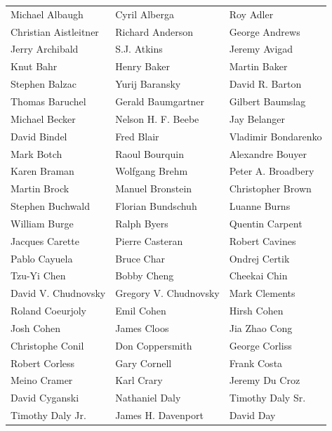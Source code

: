 \begin{tabular}{lll}
Michael Albaugh        & Cyril Alberga          & Roy Adler\\
Christian Aistleitner  & Richard Anderson       & George Andrews\\
Jerry Archibald        & S.J. Atkins            & Jeremy Avigad\\
Knut Bahr              & Henry Baker            & Martin Baker\\
Stephen Balzac         & Yurij Baransky         & David R. Barton\\
Thomas Baruchel        & Gerald Baumgartner     & Gilbert Baumslag\\
Michael Becker         & Nelson H. F. Beebe     & Jay Belanger\\
David Bindel           & Fred Blair             & Vladimir Bondarenko\\
Mark Botch             & Raoul Bourquin         & Alexandre Bouyer\\
Karen Braman           & Wolfgang Brehm         & Peter A. Broadbery\\
Martin Brock           & Manuel Bronstein       & Christopher Brown\\
Stephen Buchwald       & Florian Bundschuh      & Luanne Burns\\
William Burge          & Ralph Byers            & Quentin Carpent\\
Jacques Carette        & Pierre Casteran        & Robert Cavines\\
Pablo Cayuela          & Bruce Char             & Ondrej Certik\\
Tzu-Yi Chen            & Bobby Cheng            & Cheekai Chin\\
David V. Chudnovsky    & Gregory V. Chudnovsky  & Mark Clements\\
Roland Coeurjoly       & Emil Cohen             & Hirsh Cohen\\
Josh Cohen             & James Cloos            & Jia Zhao Cong\\
Christophe Conil       & Don Coppersmith        & George Corliss\\
Robert Corless         & Gary Cornell           & Frank Costa\\
Meino Cramer           & Karl Crary             & Jeremy Du Croz\\
David Cyganski         & Nathaniel Daly         & Timothy Daly Sr.\\
Timothy Daly Jr.       & James H. Davenport     & David Day\\

\end{tabular}
